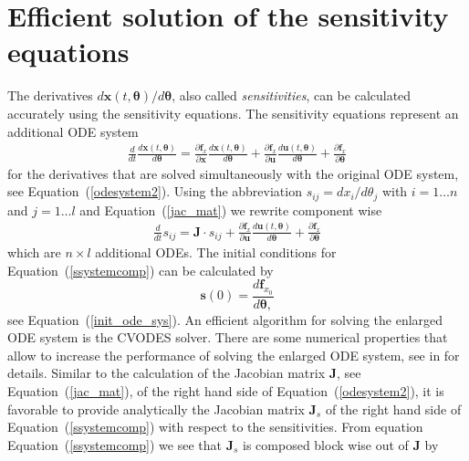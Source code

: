 \documentclass[12pt,a4paper]{scrartcl}
\newcommand{\dd}[2]{\frac{\partial #1}{\partial #2}}
\newcommand{\DD}[2]{\frac{d #1}{d #2}}
\begin{document}
\section{Efficient solution of the sensitivity equations} \label{sec:ode_simu}
The derivatives $d\mathbf{x}(t,\boldsymbol{\theta}) / d \boldsymbol{\theta}$, also called \emph{sensitivities}, can be calculated accurately using the sensitivity equations. The sensitivity equations represent an additional ODE system
\begin{eqnarray}
	\DD{}{t} \DD{\mathbf{x}(t,\boldsymbol{\theta})}{\boldsymbol{\theta}}  =  \dd{\mathbf{f}_x}{\mathbf{x}}  \DD{\mathbf{x}(t,\boldsymbol{\theta})}{\boldsymbol{\theta}} +  \dd{\mathbf{f}_x}{\mathbf{u}}  \DD{\mathbf{u}(t,\boldsymbol{\theta})}{\boldsymbol{\theta}} + \dd{\mathbf{f}_x}{\boldsymbol{\theta}} \label{ssystem2}
\end{eqnarray}
for the derivatives \citep{Leis:1988dl} that are solved simultaneously with the original ODE system, see Equation~(\ref{odesystem2}). Using the abbreviation $s_{ij} = d x_i / d \theta_j$ with $i = 1 \dots n$ and $j = 1 \dots l$ and Equation~(\ref{jac_mat}) we rewrite component wise
\begin{eqnarray}
	\DD{}{t} s_{ij}  =  \mathbf{J} \cdot s_{ij} +  \dd{\mathbf{f}_x}{\mathbf{u}}  \DD{\mathbf{u}(t,\boldsymbol{\theta})}{\boldsymbol{\theta}} + \dd{\mathbf{f}_x}{\boldsymbol{\theta}} \label{ssystemcomp}
\end{eqnarray}
which are $n \times l$ additional ODEs. The initial conditions for Equation~(\ref{ssystemcomp}) can be calculated by 
\begin{equation}
	\mathbf{s}(0) = \DD{\mathbf{f}_{x_0}}{\boldsymbol{\theta},}
\end{equation}
see Equation~(\ref{init_ode_sys}). An efficient algorithm for solving the enlarged ODE system is the CVODES solver. There are some numerical properties that allow to increase the performance of solving the enlarged ODE system, see in \cite{Hindmarsh:2005fb} for details. Similar to the calculation of the Jacobian matrix $\mathbf{J}$, see Equation~(\ref{jac_mat}), of the right hand side of Equation~(\ref{odesystem2}), it is favorable to provide analytically the Jacobian matrix $\mathbf{J}_s$ of the right hand side of Equation~(\ref{ssystemcomp}) with respect to the sensitivities. From equation Equation~(\ref{ssystemcomp}) we see that $\mathbf{J}_s$ is composed block wise out of $\mathbf{J}$ by
\end{document}
